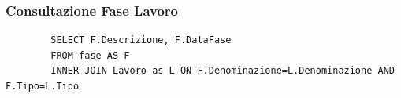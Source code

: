 \documentclass{elegantbook}
\begin{document}
\subsubsection{Consultazione Fase Lavoro}
	\begin{verbatim}
		SELECT F.Descrizione, F.DataFase
		FROM fase AS F 
		INNER JOIN Lavoro as L ON F.Denominazione=L.Denominazione AND F.Tipo=L.Tipo
	\end{verbatim}
\begin{figure}[H]
	\centering
\end{figure}
\end{document}
